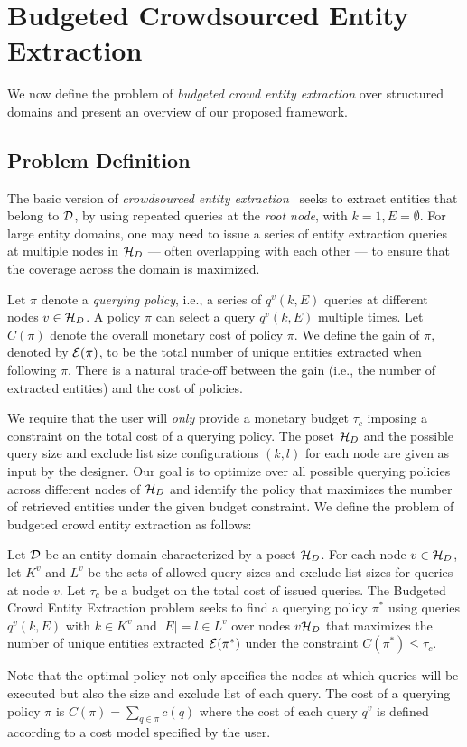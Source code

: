 \section{Budgeted Crowdsourced Entity Extraction}
\label{sec:problem}
We now define the problem of {\em budgeted crowd entity extraction} over structured domains and present an overview of our proposed framework.
\subsection{Problem Definition}
\label{sec:extraction}
The basic version of {\em crowdsourced entity extraction}~\cite{trushkowsky:2013} seeks to extract entities that belong to $\mathcal{D}$, by using repeated queries at the {\em root node}, with $k = 1, E = \emptyset$. For large entity domains, one may need to issue a series of entity extraction queries at multiple nodes in  $\mathcal{H}_D$ --- often overlapping with each other --- to ensure that the coverage across the domain is maximized.

Let $\pi$ denote a {\em querying policy}, i.e., a series of $q^v(k,E)$ queries at different nodes $v \in \mathcal{H}_D$. A policy $\pi$ can select a query $q^v(k,E)$ multiple times. Let $C(\pi)$ denote the overall monetary cost of policy $\pi$. We define the gain of $\pi$, denoted by $\mathcal{E}(\pi)$, to be the total number of unique entities extracted when following $\pi$. There is a natural trade-off between the gain (i.e., the number of extracted entities) and the cost of policies. 

We require that the user will {\em only} provide a monetary budget $\tau_c$ imposing a constraint on the total cost of a querying policy. The poset $\mathcal{H}_D$ and the possible query size and exclude list size configurations $(k,l)$ for each node are given as input by the designer. Our goal is to optimize over all possible querying policies across different nodes of $\mathcal{H}_D$ and identify the policy that maximizes the number of retrieved entities under the given budget constraint. We define the problem of budgeted crowd entity extraction as follows:

\begin{problem}
Let $\mathcal{D}$ be an entity domain characterized by a poset $\mathcal{H}_D$. For each node $v \in \mathcal{H}_D$, let $K^v$ and $L^v$ be the sets of allowed query sizes and exclude list sizes for queries at node $v$. Let $\tau_c$ be a budget on the total cost of issued queries. The Budgeted Crowd Entity Extraction problem seeks to find a querying policy $\pi^*$ using queries $q^v(k,E)$ with $k \in K^v$ and $|E| = l \in L^v$ over nodes $v \mathcal{H}_D$ that maximizes the number of unique entities extracted $\mathcal{E}(\pi^*)$ under the constraint $C(\pi^*) \leq \tau_c$.
\end{problem}
Note that the optimal policy not only specifies the nodes at which queries will be executed but also the size and exclude list of each query. The cost of a querying policy $\pi$ is $C(\pi) = \sum_{q \in \pi} c(q)$ where the cost of each query $q^v$ is defined according to a cost model specified by the user. 

